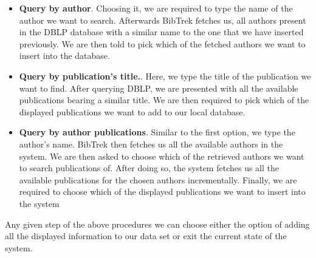 \documentclass[twocolumn]{article}
\begin{document}
\begin{itemize}
\item \textbf{Query by author}. Choosing it, we are required to type the name of the author we want to search. Afterwards BibTrek fetches us, all authors present in the DBLP database with a similar name to the one that we have inserted previously. We are then told to pick which of the fetched authors we want to insert into the database.
\item \textbf{Query by publication's title.}. Here, we type the title of the publication we want to find. After querying DBLP, we are presented with all the available publications bearing a similar title. We are then required to pick which of the displayed publications we want to add to our local database.
\item \textbf{Query by author publications}. Similar to the first option, we type the author's name. BibTrek then fetches us all the available authors in the system. We are then asked to choose which of the retrieved authors we want to search publications of. After doing so, the system fetches us all the available publications for the chosen authors incrementally. Finally, we are required to choose which of the displayed publications we want to insert into the system
\end{itemize}
Any given step of the above procedures we can choose either the option of adding all the displayed information to our data set or exit the current state of the system.
\end{document}
